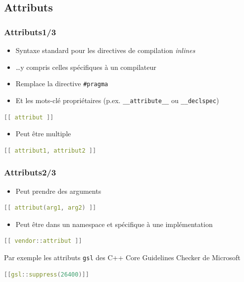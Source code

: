 \documentclass[C++.tex]{subfiles}
\begin{document}
\subsection*{Attributs}
\begin{frame}[fragile]
	\frametitle{Attributs\titlehfill{}1/3}
	\begin{itemize}
		\item Syntaxe standard pour les directives de compilation \textit{inlines}
		\item \ldots y compris celles spécifiques à un compilateur
		\item Remplace la directive \lstinline|#pragma|
		\item Et les mots-clé propriétaires (p.ex. \lstinline|__attribute__| ou \lstinline|__declspec|)
	\end{itemize}

	\begin{lstlisting}[language=C++]
[[ attribut ]]\end{lstlisting}

	\begin{itemize}
		\item Peut être multiple
	\end{itemize}

	\begin{lstlisting}[language=C++]
[[ attribut1, attribut2 ]]\end{lstlisting}
\end{frame}

\begin{frame}[fragile]
	\frametitle{Attributs\titlehfill{}2/3}
	\begin{itemize}
		\item Peut prendre des arguments
	\end{itemize}

	\begin{lstlisting}[language=C++]
[[ attribut(arg1, arg2) ]]\end{lstlisting}

	\begin{itemize}
		\item Peut être dans un namespace et spécifique à une implémentation
	\end{itemize}

	\begin{lstlisting}[language=C++]
[[ vendor::attribut ]]\end{lstlisting}

	\begin{block}{Par exemple}
		les attributs \lstinline|gsl| des \og C++ Core Guidelines Checker\fg{} de Microsoft
		
	\begin{lstlisting}[language=C++]
[[gsl::suppress(26400)]]\end{lstlisting}
	\end{block}
\end{frame}
\end{document}
